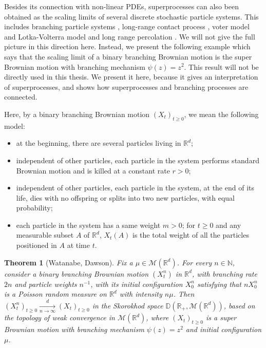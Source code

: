 \documentclass[UTF8]{pkuthss}
\theoremstyle{plain}
\newtheorem{thm}{Theorem}[section]
\theoremstyle{definition}
\numberwithin{equation}{section}
\begin{document}
	Besides its connection with non-linear PDEs, superprocesses can also been obtained as the scaling limits of several discrete stochastic particle systems. 
	This includes branching particle systems \cite{Dawson1993Measure-valued,Li2011Measure-valued,Dynkin1991Branching}, long-range contact process \cite{MullerTribe1995Stochastic,DurrettPerkins1999Rescaled}, voter model and Lotka-Volterra model \cite{CoxDurrettPerkins2000Rescaled,CoxPerkins2005Rescaled} and long range percolation \cite{LalleyZheng2010Spatial}. 
	We will not give the full picture in this direction here. Instead, we present the following example which says that the scaling limit of a binary branching Brownian motion is the super Brownian motion with branching mechanism $\psi(z) = z^2$.
	This result will not be directly used in this thesis. 
	We present it here, because it gives an interpretation of superprocesses, and shows how superprocesses and branching processes are connected.

	Here, by a binary branching Brownian motion $(X_t)_{t\geq 0}$, we mean the following model: 
\begin{itemize}
\item
	at the beginning, there are several particles living in $\mathbb R^d$;
\item
	independent of other particles, each particle in the system performs standard Brownian motion and is killed at a constant rate $r>0$;
\item
	independent of other particles, each particle in the system, at the end of its life, dies with no offspring or splits into two new particles, with equal probability;
\item
	each particle in the system has a same weight $m>0$; for $t\geq 0$ and any measurable subset $A$ of $\mathbb R^d$, $X_t(A)$ is the total weight of all the particles positioned in $A$ at time $t$. 
\end{itemize}

	
\begin{thm}[Watanabe, Dawson]
	Fix a $\mu \in \mathcal M(\mathbb R^d)$. For every $n \in \mathbb N$, consider a binary branching Brownian motion $(X_t^n)$ in $\mathbb R^d$, with branching rate $2n$ and particle weights $n^{-1}$, with its initial configuration $X_0^n$ satisfying that $nX^n_0$ is a Poisson random measure on $\mathbb R^d$ with intensity $n\mu$. Then $(X_t^n)_{t\geq 0} \xrightarrow[n\to \infty]{d} (X_t)_{t\geq 0}$ in the Skorokhod space $\mathbb D(\mathbb R_+, \mathcal M(\mathbb R^d))$, based on the topology of weak convergence in $\mathcal M(\mathbb R^d)$, where $(X_t)_{t\geq 0}$ is a super Brownian motion with branching mechanism $\psi(z) = z^2$ and initial configuration $\mu$.
\end{thm}
\end{document}
